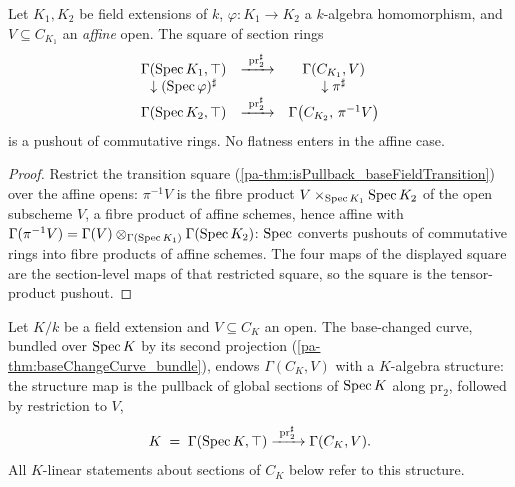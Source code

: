 \begin{theorem}
  \label{pa-thm:isPushout_transitionSections}
  \leanok

  Let \(K_1, K_2\) be field extensions of \(k\), \(\varphi : K_1 \to K_2\) a
  \(k\)-algebra homomorphism, and \(V \subseteq C_{K_1}\) an \emph{affine} open. The
  square of section rings
  \[
    \begin{array}{ccc}
      \Gamma(\Spec K_1, \top) & \xrightarrow{\ \mathrm{pr}_2^{\sharp}\ } &
        \Gamma(C_{K_1}, V) \\
      \downarrow (\Spec\varphi)^{\sharp} & & \downarrow \pi^{\sharp} \\
      \Gamma(\Spec K_2, \top) & \xrightarrow{\ \mathrm{pr}_2^{\sharp}\ } &
        \Gamma\bigl(C_{K_2},\, \pi^{-1}V\bigr)
    \end{array}
  \]
  is a pushout of commutative rings. No flatness enters in the affine case.
\end{theorem}
\begin{proof}
  \leanok
  Restrict the transition square (\ref{pa-thm:isPullback_baseFieldTransition}) over the
  affine opens: \(\pi^{-1}V\) is the fibre product \(V \times_{\operatorname{Spec} K_1} \operatorname{Spec} K_2\) of
  the open subscheme \(V\), a fibre product of affine schemes, hence affine with
  \(\Gamma(\pi^{-1}V) = \Gamma(V) \otimes_{\Gamma(\operatorname{Spec} K_1)} \Gamma(\operatorname{Spec} K_2)\):
  \(\operatorname{Spec}\) converts pushouts of commutative rings into fibre products of affine
  schemes. The four maps of the displayed square are the section-level maps of that
  restricted square, so the square is the tensor-product pushout.
\end{proof}

\begin{definition}
  \label{pa-def:baseChangeSectionsAlgebra}
  \leanok

  Let \(K/k\) be a field extension and \(V \subseteq C_K\) an open. The base-changed
  curve, bundled over \(\operatorname{Spec} K\) by its second projection
  (\ref{pa-thm:baseChangeCurve_bundle}), endows \(\Gamma(C_K, V)\) with a \(K\)-algebra
  structure: the structure map is the pullback of global sections of \(\operatorname{Spec} K\) along
  \(\mathrm{pr}_2\), followed by restriction to \(V\),
  \[
    K \;=\; \Gamma(\operatorname{Spec} K, \top) \xrightarrow{\ \mathrm{pr}_2^{\sharp}\ }
      \Gamma(C_K, V).
  \]
  All \(K\)-linear statements about sections of \(C_K\) below refer to this structure.
\end{definition}

